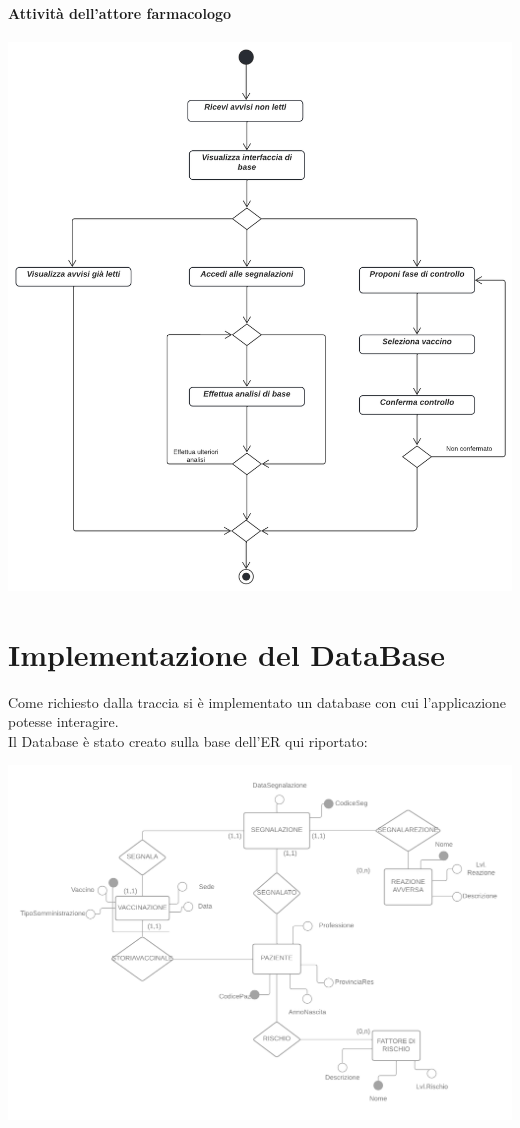 \documentclass{article}
\begin{document}
\paragraph*{Attività dell'attore farmacologo}
\begin{center}
    \includegraphics[width=1\textwidth]{pictures/ActivityDiagram_Farmacologo.png}
\end{center}


\newpage
\section{Implementazione del DataBase}
Come richiesto dalla traccia si è implementato un database con cui l'applicazione potesse interagire.\\
Il Database è stato creato sulla base dell'ER qui riportato:
\begin{center}
    \includegraphics[width=1\textwidth]{pictures/_Diagramma vuoto.png}
\end{center}
\end{document}
